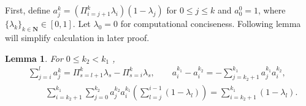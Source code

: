 \documentclass{article} %
\newcommand*{\para}[1]{\left({#1}\right)}
\newtheorem{lemma}{Lemma}
\begin{document}
First, define  $a^k_{j} = \para{\Pi^{k}_{i=j+1}\lambda_{i}}(1-\lambda_{j})$ for $ 0 \le  j \le k$ and $a^0_0=1$, where $\{\lambda_k\}_{k \in \mathbf{N}} \in [0,1]$. Let $\lambda_0=0$ for computational conciseness. Following lemma will simplify calculation in later proof. 
\begin{lemma}\label{lem::KM_coeff}
   For $0 \le k_2 < k_1$ , 
    \begin{align*}
        &\sum^{l}_{j=i} a^{k}_j = \Pi^{k}_{s=l+1}\lambda_{s}-\Pi^{k}_{s=i}\lambda_{s},  \qquad  a^{k_1}_i-a^{k_2}_i = -\sum^{k_1}_{j=k_2+1} a^{k_1}_ja^{k_2}_i, 
        \\& \qquad \sum^{k_1}_{i=k_2+1}\sum^{k_2}_{j=0} a^{k_2}_j  a^{k_1}_i \para{ \sum^{i-1}_{l=j} (1-\lambda_{l})}=\sum^{k_1}_{i=k_2+1}(1-\lambda_{l}).
    \end{align*}
\end{lemma}
\end{document}

